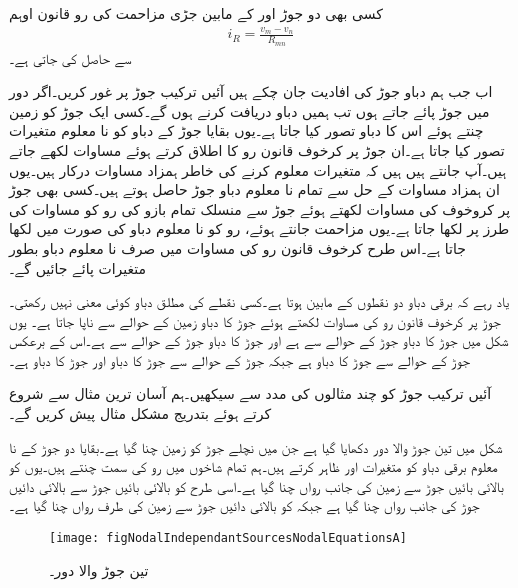 کسی بھی دو جوڑ  اور  کے مابین جڑی مزاحمت  کی رو  قانون اوہم
\begin{align}\label{مساوات-جوڑ_قانون_اوہم}
i_R=\frac{v_m-v_n}{R_{mn}}
\end{align}
سے حاصل کی جاتی ہے۔

اب جب ہم دباو جوڑ کی افادیت جان چکے ہیں آئیں ترکیب جوڑ پر غور کریں۔اگر دور میں  جوڑ پائے جاتے ہوں تب ہمیں  دباو دریافت کرنے ہوں گے۔کسی ایک جوڑ کو زمین چنتے ہوئے اس کا دباو  تصور کیا جاتا ہے۔یوں بقایا  جوڑ کے دباو کو نا معلوم متغیرات تصور کیا جاتا ہے۔ان  جوڑ پر کرخوف قانون رو کا اطلاق کرتے ہوئے  مساوات لکھے جاتے ہیں۔آپ جانتے ہیں ہیں کہ  متغیرات معلوم کرنے کی خاطر  ہمزاد مساوات درکار ہیں۔یوں ان  ہمزاد مساوات کے حل سے تمام نا معلوم دباو جوڑ حاصل ہوتے ہیں۔کسی بھی جوڑ پر کروخوف کی مساوات لکھتے ہوئے جوڑ سے منسلک تمام بازو کی رو کو مساوات  کی طرز پر لکھا جاتا ہے۔یوں مزاحمت جانتے ہوئے، رو کو نا معلوم دباو کی صورت میں لکھا جاتا ہے۔اس طرح کرخوف قانون رو کی مساوات میں صرف نا معلوم دباو بطور متغیرات پائے جائیں گے۔

 یاد رہے کہ برقی دباو دو نقطوں کے مابین ہوتا ہے۔کسی نقطے کی مطلق دباو کوئی معنی نہیں رکھتی۔جوڑ پر کرخوف قانون رو کی مساوات لکھتے ہوئے جوڑ کا دباو زمین کے حوالے سے ناپا جاتا ہے۔ یوں شکل  میں جوڑ  کا دباو جوڑ  کے حوالے سے  ہے اور جوڑ  کا دباو جوڑ  کے حوالے سے  ہے۔اس کے برعکس جوڑ  کے حوالے سے جوڑ  کا دباو  ہے جبکہ جوڑ  کے حوالے سے جوڑ  کا دباو  اور جوڑ  کا دباو  ہے۔ 


آئیں ترکیب جوڑ کو چند مثالوں کی مدد سے سیکھیں۔ہم آسان ترین مثال سے شروع کرتے ہوئے بتدریج مشکل مثال پیش کریں گے۔

شکل  میں تین جوڑ والا دور دکھایا گیا ہے جن میں نچلے جوڑ کو زمین چنا گیا ہے۔بقایا دو جوڑ کے نا معلوم برقی دباو کو متغیرات  اور  ظاہر کرتے ہیں۔ہم تمام شاخوں میں رو کی سمت چنتے ہیں۔یوں  کو بالائی بائیں جوڑ سے زمین کی جانب رواں چنا گیا ہے۔اسی طرح  کو بالائی بائیں جوڑ سے بالائی دائیں جوڑ کی جانب رواں چنا گیا ہے جبکہ  کو بالائی دائیں جوڑ سے زمین کی طرف رواں چنا گیا ہے۔
\begin{figure}
\centering
\texttt{[image: figNodalIndependantSourcesNodalEquationsA]}
\caption{تین جوڑ والا دور۔}
\label{شکل_جوڑ_تین_جوڑ}
\end{figure}%

